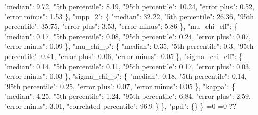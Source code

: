 {{          "median": 9.72, %
          "5th percentile": 8.19, %
          "95th percentile": 10.24, %
          "error plus": 0.52, %
          "error minus": 1.53%
        \}, %
        "mpp\_2": \{%
          "median": 32.22, %
          "5th percentile": 26.36, %
          "95th percentile": 35.75, %
          "error plus": 3.53, %
          "error minus": 5.86%
        \}, %
        "mu\_chi\_eff": \{%
          "median": 0.17, %
          "5th percentile": 0.08, %
          "95th percentile": 0.24, %
          "error plus": 0.07, %
          "error minus": 0.09%
        \}, %
        "mu\_chi\_p": \{%
          "median": 0.35, %
          "5th percentile": 0.3, %
          "95th percentile": 0.41, %
          "error plus": 0.06, %
          "error minus": 0.05%
        \}, %
        "sigma\_chi\_eff": \{%
          "median": 0.14, %
          "5th percentile": 0.11, %
          "95th percentile": 0.17, %
          "error plus": 0.03, %
          "error minus": 0.03%
        \}, %
        "sigma\_chi\_p": \{%
          "median": 0.18, %
          "5th percentile": 0.14, %
          "95th percentile": 0.25, %
          "error plus": 0.07, %
          "error minus": 0.05%
        \}, %
        "kappa": \{%
          "median": 4.25, %
          "5th percentile": 1.24, %
          "95th percentile": 6.84, %
          "error plus": 2.59, %
          "error minus": 3.01, %
          "correlated percentile": 96.9%
        \}%
      \}, %
      "ppd": \{\}%
    \}}%
  \else%
    \ifnum{}=0%
      \let\zchieffCopulaCorrelationModel@out\zchieffCopulaCorrelationModel@I%
    \else%
      \ifnum{}=0%
      \let\zchieffCopulaCorrelationModel@out\zchieffCopulaCorrelationModel@II%
    \else%
      \def\zchieffCopulaCorrelationModel@out{%
    ??}%
    \fi\fi
  \fi
  \zchieffCopulaCorrelationModel@out
}\newcommand\zchieffCopulaCorrelationModel@I[1][all]{%
  \ifnum\pdfstrcmp{#1}{all}=0%
    \def\zchieffCopulaCorrelationModel@I@out{%
    \{%
      "alpha\_1": \{%
        "median": 1.87, %
        "5th percentile": 0.06, %
        "95th percentile": 3.13, %
        "error plus": 1.26, %
        "error minus": 1.81%
      \}, %
      "alpha\_2": \{%
        "median": 4.71, %
        "5th percentile": 3.3, %
        "95th percentile": 6.19, %
        "error plus": 1.48, %
        "error minus": 1.41%
      \}, %
      "beta": \{%
        "median": 1.35, %
        "5th percentile": 0.28, %
        "95th percentile": 2.64, %
        "error plus": 1.29, %
        "error minus": 1.07%
      \}, %
      "break\_mass": \{%
        "median": 35.37, %
}}
